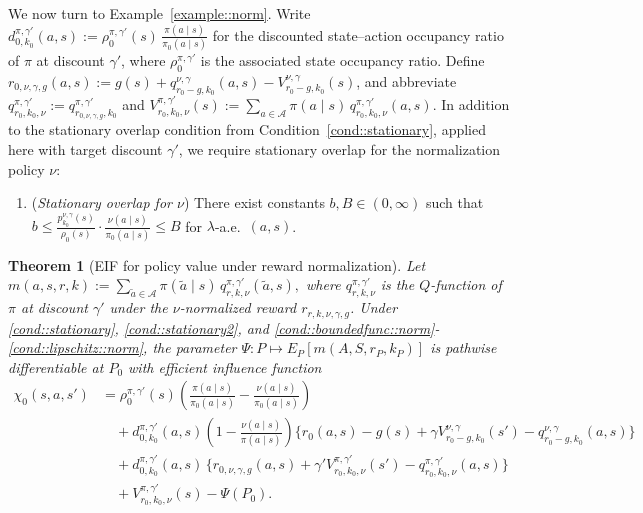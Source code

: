 \documentclass[12pt]{article}
\theoremstyle{plain}
\newtheorem{theorem}{Theorem}
\begin{document}
We now turn to Example~\ref{example::norm}. Write
$d_{0,k_0}^{\pi,\gamma'}(a,s):=\rho_0^{\pi,\gamma'}(s)\,
\frac{\pi(a \mid s)}{\pi_0(a \mid s)}$ for the discounted state--action
occupancy ratio of \(\pi\) at discount \(\gamma'\), where
\(\rho_0^{\pi,\gamma'}\) is the associated state occupancy ratio. Define
$r_{0,\nu,\gamma,g}(a,s):=g(s)+q_{r_0-g,k_0}^{\nu,\gamma}(a,s)-
V_{r_0-g,k_0}^{\nu,\gamma}(s)$, and abbreviate
$q_{r_0,k_0,\nu}^{\pi,\gamma'}:=q_{r_{0,\nu,\gamma,g},k_0}^{\pi,\gamma'}$
and
$V_{r_0,k_0,\nu}^{\pi,\gamma'}(s):=\sum_{a\in\mathcal A}\pi(a\mid s)\,
q_{r_0,k_0,\nu}^{\pi,\gamma'}(a,s)$. In addition to the stationary overlap
condition from Condition~\ref{cond::stationary}, applied here with target
discount \(\gamma'\), we require stationary overlap for the normalization
policy \(\nu\):

\begin{enumerate}[label=\textbf{(D\arabic*)}, ref=D\arabic*, resume=condexample]
    \item (\textit{Stationary overlap for $\nu$}) There exist constants
    $b, B \in (0,\infty)$ such that
    $b \le \frac{p_{k_0}^{\nu,\gamma}(s)}{\rho_0(s)}
    \cdot \frac{\nu(a \mid s)}{\pi_0(a \mid s)} \le B$
    for $\lambda$-a.e.\ $(a,s)$. \label{cond::stationary2}
\end{enumerate}

\begingroup
\begin{theorem}[EIF for policy value under reward normalization]
\label{theorem::EIFvaluenorm}
Let $m(a,s,r,k)
:= \sum_{\tilde a \in \mathcal A}\pi(\tilde a \mid s)\,
q_{r,k,\nu}^{\pi,\gamma'}(\tilde a,s),$ where \(q_{r,k,\nu}^{\pi,\gamma'}\) is the \(Q\)-function of \(\pi\) at discount
\(\gamma'\) under the \(\nu\)-normalized reward \(r_{r,k,\nu,\gamma,g}\).
Under \ref{cond::stationary}, \ref{cond::stationary2}, and
\ref{cond::boundedfunc::norm}-\ref{cond::lipschitz::norm}, the parameter
\(\Psi: P \mapsto E_P[m(A,S,r_P,k_P)]\) is pathwise differentiable at \(P_0\)
with efficient influence function
\begin{align*}
\chi_0(s,a,s')
&= \rho_0^{\pi,\gamma'}(s)\left(\frac{\pi(a\mid s)}{\pi_0(a\mid s)}
   - \frac{\nu(a\mid s)}{\pi_0(a\mid s)}\right) \\[4pt]
&\quad + d_{0,k_0}^{\pi,\gamma'}(a,s)
   \left(1 - \frac{\nu(a \mid s)}{\pi(a \mid s)}\right)
   \bigl\{r_0(a,s) - g(s) + \gamma V_{r_0-g, k_0}^{\nu,\gamma}(s')
   - q_{r_0-g, k_0}^{\nu,\gamma}(a,s)\bigr\} \\[4pt]
&\quad + d_{0,k_0}^{\pi,\gamma'}(a,s)\,
   \bigl\{r_{0,\nu,\gamma,g}(a,s)
   + \gamma' V_{r_0, k_0,\nu}^{\pi,\gamma'}(s')
   - q_{r_0, k_0,\nu}^{\pi,\gamma'}(a,s)\bigr\} \\[4pt]
&\quad + V_{r_0,k_0,\nu}^{\pi,\gamma'}(s) - \Psi(P_0).
\end{align*}
\end{theorem}
\endgroup
\end{document}
